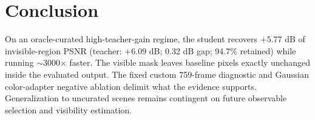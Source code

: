 \documentclass[10pt,twocolumn,letterpaper]{article}
\begin{document}
\section{Conclusion}
\label{sec:concl}
On an oracle-curated high-teacher-gain regime, the student recovers $+5.77$ dB of
invisible-region PSNR (teacher: $+6.09$ dB; 0.32 dB gap; 94.7\% retained) while
running $\sim$3000$\times$ faster. The visible mask leaves baseline pixels exactly
unchanged inside the evaluated output. The fixed custom 759-frame diagnostic and
Gaussian color-adapter negative ablation delimit what the evidence supports.
Generalization to uncurated scenes remains contingent on future observable
selection and visibility estimation.

{\small


}
\end{document}
